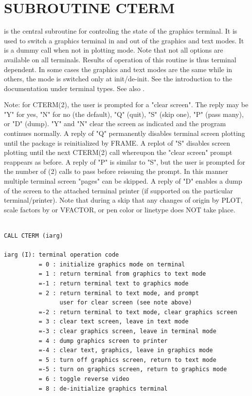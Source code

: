\documentclass[11pt]{report}
\begin{document}
\section{SUBROUTINE CTERM}

 is the central subroutine for controling the state of the graphics
terminal.  It is used to switch a graphics terminal
in and out of the graphics and text modes. It is a dummy call when not in
 plotting mode.  Note that not all options are available on all
terminals.  Results of operation of this routine is thus terminal dependent.
In some cases the graphics and text modes are the same while in others,
the mode is switched only at init/de-init.
See the introduction to the documentation under terminal types.  See also
.

Note:  for CTERM(2), the user is prompted for a "clear screen".
The reply may be "Y" for yes, "N" for no (the default), "Q" (quit), 
"S" (skip one), "P" (pass many), or "D" (dump).  "Y" and "N" clear
the screen as indicated and the program continues normally.
A reply of "Q" permanently disables terminal screen plotting until
the package is reinitialized by FRAME.  A replot of "S" disables
screen plotting until the next CTERM(2) call whereupon the 
"clear screen" prompt reappears as before.  A reply of "P" is similar
to "S", but the user is prompted for the number of (2) calls
to pass before reissuing the prompt.  In this manner multiple terminal
screen "pages" can be skipped.  A reply of "D" enables a dump
of the screen to the attached terminal printer (if supported on the
particular terminal/printer).  Note that during a skip that any changes
of origin by PLOT, scale factors by  or VFACTOR, or pen color
or linetype does NOT take place.
\begin{verbatim}

CALL CTERM (iarg)

iarg (I): terminal operation code
          = 0 : initialize graphics mode on terminal
          = 1 : return terminal from graphics to text mode
          =-1 : return terminal text to graphics mode
          = 2 : return terminal to text mode, and prompt
                user for clear screen (see note above)
          =-2 : return terminal to text mode, clear graphics screen
          = 3 : clear text screen, leave in text mode
          =-3 : clear graphics screen, leave in terminal mode
          = 4 : dump graphics screen to printer
          =-4 : clear text, graphics, leave in graphics mode
          = 5 : turn off graphics screen, return to text mode
          =-5 : turn on graphics screen, return to graphics mode
          = 6 : toggle reverse video
          = 8 : de-initialize graphics terminal
\end{verbatim}
\end{document}
